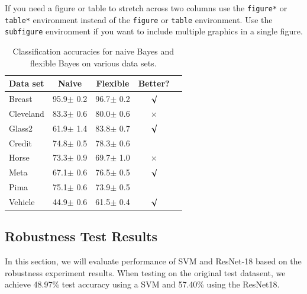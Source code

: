 \documentclass{article}
\begin{document}
If you need a figure or table to stretch across two columns use the \verb+figure*+ or \verb+table*+ environment instead of the \verb+figure+ or \verb+table+ environment.  Use the \verb+subfigure+ environment if you want to include multiple graphics in a single figure.



\begin{table}[tb]
\vskip 3mm
\begin{center}
\begin{small}
\begin{sc}
\begin{tabular}{lcccr}
\hline
\abovespace\belowspace
Data set & Naive & Flexible & Better? \\
\hline
\abovespace
Breast    & 95.9$\pm$ 0.2& 96.7$\pm$ 0.2& $\surd$ \\
Cleveland & 83.3$\pm$ 0.6& 80.0$\pm$ 0.6& $\times$\\
Glass2    & 61.9$\pm$ 1.4& 83.8$\pm$ 0.7& $\surd$ \\
Credit    & 74.8$\pm$ 0.5& 78.3$\pm$ 0.6&         \\
Horse     & 73.3$\pm$ 0.9& 69.7$\pm$ 1.0& $\times$\\
Meta      & 67.1$\pm$ 0.6& 76.5$\pm$ 0.5& $\surd$ \\
Pima      & 75.1$\pm$ 0.6& 73.9$\pm$ 0.5&         \\
\belowspace
Vehicle   & 44.9$\pm$ 0.6& 61.5$\pm$ 0.4& $\surd$ \\
\hline
\end{tabular}
\end{sc}
\end{small}
\caption{Classification accuracies for naive Bayes and flexible 
Bayes on various data sets.}
\label{tab:sample-table}
\end{center}
\vskip -3mm
\end{table}
\fi

\subsection{Robustness Test Results}
In this section, we will evaluate performance of SVM and ResNet-18 based on the robustness experiment results. When testing on the original test datasent, we achieve 48.97\% test accuracy using a SVM and 57.40\% using the ResNet18.
\end{document}
